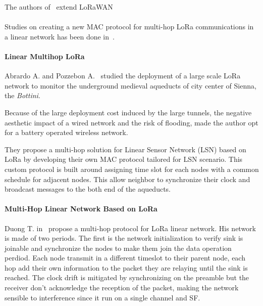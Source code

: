 The authors of~\cite{8856256} extend LoRaWAN


\paragraph{}

Studies on creating a new MAC protocol for multi-hop LoRa communications in a linear
network has been done in~\cite{Abrardo_2019,duong2018}.

\paragraph{Linear Multihop LoRa}

Abrardo A. and Pozzebon A.~\cite{Abrardo_2019} studied the deployment of a
large scale LoRa network to monitor the underground medieval aqueducts of city center 
of Sienna, the \emph{Bottini}.

Because of the large deployment cost induced by the large tunnels, the negative 
aesthetic impact of a wired network and the risk of flooding, made the author
opt for a battery operated wireless network.

They propose a multi-hop solution for Linear Sensor Network (LSN) based on LoRa by
developing their own MAC protocol tailored for LSN scenario.
This custom protocol is built around assigning time slot for each nodes with
a common schedule for adjacent nodes.
This allow neighbor to synchronize their clock and broadcast messages to the
both end of the aqueducts.


\paragraph{Multi-Hop Linear Network Based on LoRa}

Duong T. in~\cite{duong2018} propose a multi-hop protocol for LoRa linear
network. 
His network is made of two periods. The first is the network initialization to
verify sink is joinable and synchronize the nodes to make them join the data
operation perdiod.
Each node transmit in a different timeslot to their parent node, each hop add
their own information to the packet they are relaying until the sink is
reached.
The clock drift is mitigated by synchronizing on the preamble but the receiver
don't acknowledge the reception of the packet, making the network sensible to
interference since it run on a single channel and SF.

